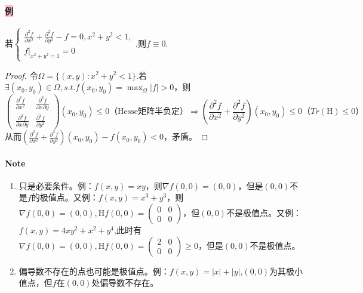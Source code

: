 \documentclass[UTF8]{ctexart}
\begin{document}
    \paragraph{\colorbox{pink}{例}}若$\begin{cases}
        \frac{\partial^2f}{\partial x^2}+\frac{\partial^2f}{\partial y^2}-f=0,x^2+y^2<1,\\
        f|_{x^2+y^2=1}=0
    \end{cases}$,则$f\equiv 0$.
    \begin{proof}
        令$\Omega=\{(x,y):x^2+y^2<1\}$.若$\exists(x_0,y_0)\in \Omega,s.t.f(x_0,y_0)=\max_{\Omega}|f|>0$，则$$\begin{pmatrix}
            \frac{\partial^2f}{\partial x^2}&\frac{\partial^2f}{\partial x\partial y}\\
            \frac{\partial^2f}{\partial x\partial y}&\frac{\partial^2f}{\partial y^2}
        \end{pmatrix}(x_0,y_0)\le 0\text{（Hesse矩阵半负定）}\Rightarrow \left(\frac{\partial^2f}{\partial x^2}+\frac{\partial^2f}{\partial y^2}\right)(x_0,y_0)\le 0\text{（}Tr(\mathrm{H})\le 0\text{）}$$
        从而$\left(\frac{\partial^2f}{\partial x^2}+\frac{\partial^2f}{\partial y^2}\right)(x_0,y_0)-f(x_0,y_0)<0$，矛盾。
    \end{proof}

    \paragraph{\colorbox{orange!75}{Note}}\begin{enumerate}
        \item 只是必要条件。例：$f(x,y)=xy$，则$\nabla f(0,0)=(0,0)$，但是$(0,0)$不是$f$的极值点。又例：$f(x,y)=x^3+y^3$，则$\nabla f(0,0)=(0,0),\mathrm{H}f(0,0)=\begin{pmatrix}
            0&0\\
            0&0
        \end{pmatrix}$，但$(0,0)$不是极值点。又例：$f(x,y)=4xy^2+x^2+y^4$,此时有$\nabla f(0,0)=(0,0),\mathrm{H}f(0,0)=\begin{pmatrix}
            2&0\\
            0&0
        \end{pmatrix}\ge 0$，但是$(0,0)$不是极值点。
        \item 偏导数不存在的点也可能是极值点。例：$f(x,y)=|x|+|y|$,$(0,0)$为其极小值点，但$f$在$(0,0)$处偏导数不存在。
    \end{enumerate}
\end{document}

